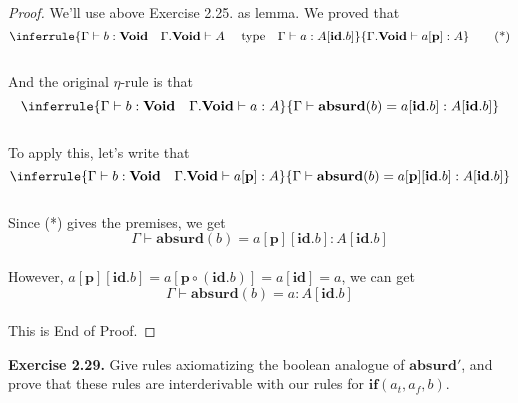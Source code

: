 \documentclass[12pt, letterpaper]{amsart}
\theoremstyle{definition}
\theoremstyle{remark}
\theoremstyle{plain}
\numberwithin{equation}{section}
\begin{document}
\begin{proof}

We'll use above Exercise 2.25. as lemma. We proved that 
\[
\inferrule
{
    \Gamma \vdash b : \mathbf{Void} \quad  \Gamma.\mathbf{Void} \vdash A \quad \text{ type} \quad \Gamma \vdash a : A[\mathbf{id}.b]
}
{
    \Gamma.\mathbf{Void} \vdash a[\mathbf{p}] : A
}
\tag{*}
\] \\
And the original $\eta$-rule is that 
\[
\inferrule
{
    \Gamma \vdash b : \mathbf{Void} \quad \Gamma.\mathbf{Void} \vdash a : A 
}
{
    \Gamma \vdash \mathbf{absurd}(b) = a[\mathbf{id}.b] : A[\mathbf{id}.b]
}
\] \\
To apply this, let's write that 
\[
\inferrule
{
    \Gamma \vdash b : \mathbf{Void} \quad \Gamma.\mathbf{Void} \vdash a[\mathbf{p}] : A 
}
{
    \Gamma \vdash \mathbf{absurd}(b) = a[\mathbf{p}][\mathbf{id}.b] : A[\mathbf{id}.b]
}
\]\\
Since (*) gives the premises, we get 
\[\Gamma \vdash \mathbf{absurd}(b) = a[\mathbf{p}][\mathbf{id}.b] : A[\mathbf{id}.b]\]
\\
However, $a[\mathbf{p}][\mathbf{id}.b] = a[\mathbf{p}\circ (\mathbf{id}.b)] = a[\mathbf{id}] = a$, we can get 
\[\Gamma \vdash  \mathbf{absurd}(b) = a : A[\mathbf{id}.b]\]
\\
This is End of Proof. 
\end{proof}

\newpage 

\textbf{Exercise 2.29.} Give rules axiomatizing the boolean analogue of $\mathbf{absurd}'$, and prove 
that these rules are interderivable with our rules for $\mathbf{if}(a_t, a_f, b)$. 
\end{document}
